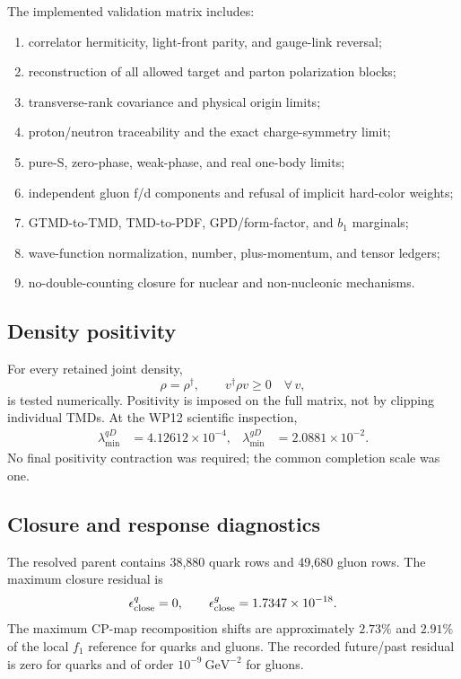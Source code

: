 \documentclass[11pt]{article}
\begin{document}
The implemented validation matrix includes:
\begin{enumerate}
  \item correlator hermiticity, light-front parity, and gauge-link reversal;
  \item reconstruction of all allowed target and parton polarization blocks;
  \item transverse-rank covariance and physical origin limits;
  \item proton/neutron traceability and the exact charge-symmetry limit;
  \item pure-S, zero-phase, weak-phase, and real one-body limits;
  \item independent gluon f/d components and refusal of implicit hard-color
  weights;
  \item GTMD-to-TMD, TMD-to-PDF, GPD/form-factor, and \(b_1\) marginals;
  \item wave-function normalization, number, plus-momentum, and tensor
  ledgers;
  \item no-double-counting closure for nuclear and non-nucleonic mechanisms.
\end{enumerate}

\subsection{Density positivity}

For every retained joint density,
\begin{equation}
\rho=\rho^\dagger,\qquad
v^\dagger\rho v\geq0
\quad\forall\,v,
\label{eq:positivity}
\end{equation}
is tested numerically.  Positivity is imposed on the full matrix, not by
clipping individual TMDs.  At the WP12 scientific inspection,
\begin{align}
\lambda_{\min}^{qD}&=4.12612\times10^{-4},&
\lambda_{\min}^{gD}&=2.0881\times10^{-2}.
\label{eq:min-eigs}
\end{align}
No final positivity contraction was required; the common completion scale
was one.

\subsection{Closure and response diagnostics}

The resolved parent contains 38,880 quark rows and 49,680 gluon rows.
The maximum closure residual is
\begin{equation}
\epsilon_{\rm close}^{q}=0,\qquad
\epsilon_{\rm close}^{g}=1.7347\times10^{-18}.
\label{eq:closure}
\end{equation}
The maximum CP-map recomposition shifts are approximately
\(2.73\%\) and \(2.91\%\) of the local \(f_1\) reference for quarks and
gluons.  The recorded future/past residual is zero for quarks and of order
\(10^{-9}~\mathrm{GeV}^{-2}\) for gluons.
\end{document}
